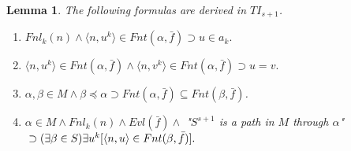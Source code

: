 \documentclass{asl}
\newtheorem{lemma}{Lemma}[section]
\theoremstyle{definition}
\begin{document}
\begin{lemma}
The following formulas are derived in $TI_{s+1}$.
\begin{enumerate}
\item $Fnl_k(n)\wedge\langle n,u^k\rangle\in Fnt(\alpha,\bar{f})\supset u\in a_k.$
\medskip
\item $\langle n,u^k\rangle\in Fnt(\alpha,\bar{f})\wedge\langle n,v^k\rangle\in Fnt(\alpha,\bar{f})\supset u=v.$
\medskip
\item $\alpha,\beta\in M\wedge\beta\preceq\alpha\supset Fnt(\alpha,\bar{f})\subseteq Fnt(\beta,\bar{f})$.
\medskip
\item $\alpha\in M\wedge Fnl_k(n)\wedge Evl(\bar{f})\wedge$ "$S^{s+1}$ is a path in $M$ through $\alpha$" $
\smallskip
\\
\supset(\exists\beta\in S)\exists u^k[\langle n,u\rangle\in Fnt(\beta,\bar{f})].$
\end{enumerate}
\label{lemma:frc6}
\end{lemma}
\end{document}

